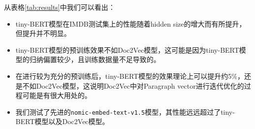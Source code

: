 \documentclass{article}
\begin{document}
从表格\ref{tab:results}中我们可以看出：
\begin{itemize}
  \item tiny-BERT模型在IMDB测试集上的性能随着hidden size的增大而有所提升，但提升并不明显。
  \item tiny-BERT模型的预训练效果不如Doc2Vec模型，这可能是因为tiny-BERT模型的归纳偏置较少，且训练数据量不足导致的。
  \item 在进行较为充分的预训练后，tiny-BERT模型的效果理论上可以提升约5\%，还是不如Doc2Vec模型，这说明Doc2Vec中对Paragraph vector进行迭代优化的过程可能是有很大用处的。
  \item 我们测试了先进的\verb|nomic-embed-text-v1.5|模型，其性能远远超过了tiny-BERT模型以及Doc2Vec模型。
\end{itemize}






\end{document}
